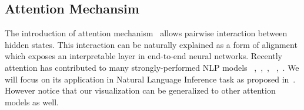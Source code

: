 \subsection{Attention Mechansim}
\label{sec:attention}
The introduction of attention mechanism~\cite{bahdanau2014neural} allows
pairwise interaction between hidden states. This interaction can be naturally explained
as a form of alignment which exposes an interpretable layer in end-to-end neural networks.
Recently attention has contributed to many strongly-performed NLP models
~\cite{parikh2016emnlp},~\cite{rush2015neural},~\cite{yang2016hierarchical},
~\cite{seo2016bidirectional},~\cite{schwartz2017high}.
We will focus on its application in Natural Language Inference task as proposed in~\cite{parikh2016emnlp}.
However notice that our visualization can be generalized to other attention models as well.

